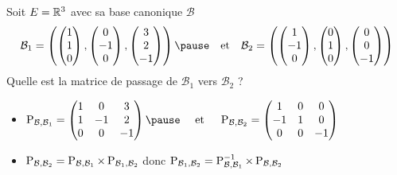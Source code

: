 \begin{frame}
\begin{exemple}
\label{ex:matpassag}
Soit $E = \mathbb{R}^3$ avec sa base canonique $\mathcal{B}$
\pause
$$\mathcal{B}_1 = 
\left(
\begin{pmatrix} 1\\1\\0\end{pmatrix},
\begin{pmatrix} 0 \\ -1 \\ 0\end{pmatrix},
\begin{pmatrix} 3\\2\\-1\end{pmatrix}
\right)
\pause\quad \text{et} \quad
\mathcal{B}_2 = 
\left(
\begin{pmatrix} 1\\-1\\0\end{pmatrix},
\begin{pmatrix} 0 \\ 1 \\ 0\end{pmatrix},
\begin{pmatrix} 0\\0\\-1\end{pmatrix}
\right)$$
\pause
Quelle est la matrice de passage de $\mathcal{B}_1$ vers $\mathcal{B}_2$ ?

\pause
\begin{itemize}

  \item $\Pass_{\mathcal{B}, \mathcal{B}_1} = 
\begin{pmatrix}
1 & 0 & 3\\
1 & -1 & 2\\
0 & 0 &-1
\end{pmatrix}
\pause
\quad \text{ et } \quad 
\Pass_{\mathcal{B}, \mathcal{B}_2} = 
\begin{pmatrix}
1 & 0 & 0\\
-1 & 1 & 0\\
0 & 0 &-1
\end{pmatrix}$

\pause
  \item $\mathop{\text{P}}\nolimits_{\mathcal{B}, \mathcal{B}_2} 
  = \mathop{\text{P}}\nolimits_{\mathcal{B}, \mathcal{B}_1} \times \mathop{\text{P}}\nolimits_{\mathcal{B}_1, \mathcal{B}_2}$
  \pause
  \quad donc \quad
  $\mathop{\text{P}}\nolimits_{\mathcal{B}_1, \mathcal{B}_2} 
  =  \mathop{\text{P}}\nolimits_{\mathcal{B}, \mathcal{B}_1}^{-1} \times \mathop{\text{P}}\nolimits_{\mathcal{B}, \mathcal{B}_2}$


\end{itemize}
\end{exemple}
\end{frame}
